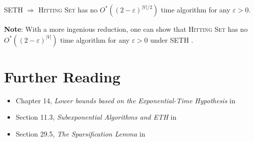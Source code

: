 \begin{frame}

 \begin{theorem}
  SETH $\Rightarrow$ \textsc{Hitting Set} has no $O^*((2-\varepsilon)^{|V|/2})$ time algorithm for any $\varepsilon>0$.
 \end{theorem}
 \noindent
 \textbf{Note}: With a more ingenious reduction, one can show that \textsc{Hitting Set} has no $O^*((2-\varepsilon)^{|V|})$ time algorithm for any $\varepsilon>0$ under SETH \cite{CyganDLMNOPSW16}.
\end{frame}

\section{Further Reading}

\begin{frame}

 \begin{itemize}
   \item Chapter 14, \emph{Lower bounds based on the Exponential-Time Hypothesis} in \cite{CyganFKL+15}
 	\item Section 11.3, \emph{Subexponential Algorithms and ETH} in \cite{FominK10}
 	\item Section 29.5, \emph{The Sparsification Lemma} in \cite{DowneyF13}
 \end{itemize}

\end{frame}

\begin{frame}[t, allowframebreaks]
	\printbibliography
\end{frame}




